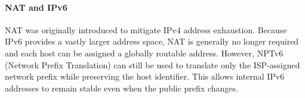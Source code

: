 \paragraph{NAT and IPv6}
NAT was originally introduced to mitigate IPv4 address exhaustion.
Because IPv6 provides a vastly larger address space, NAT is generally no
longer required and each host can be assigned a globally routable
address. However, NPTv6 (Network Prefix Translation) can still be used
to translate only the ISP-assigned network prefix while preserving the
host identifier. This allows internal IPv6 addresses to remain stable
even when the public prefix changes.